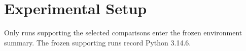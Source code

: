 \section{Experimental Setup}
Only runs supporting the selected comparisons enter the frozen environment summary.  The frozen supporting runs record Python 3.14.6.
